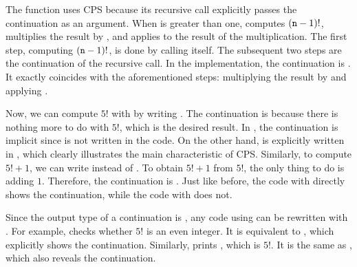 The function uses CPS because its recursive call explicitly passes the
continuation as an argument. When  is greater than one,
 computes $(\texttt{n}-1)!$, multiplies the result by
, and applies  to the result of the multiplication. The first
step, computing $(\texttt{n}-1)!$, is done by calling  itself.
The subsequent two steps are the continuation of the recursive call. In the
implementation, the continuation is . It exactly coincides
with the aforementioned steps: multiplying the result by  and applying
.

Now, we can compute $5!$ with  by writing
.
The continuation is  because there is nothing more to do with
$5!$, which is the desired result. In , the continuation is
implicit since  is not written in the code. On the other hand,
 is explicitly written in , which
clearly illustrates the main characteristic of CPS.
Similarly, to compute $5!+1$, we can write 
instead of . To obtain $5!+1$ from $5!$, the only thing
to do is adding $1$. Therefore, the continuation is . Just like
before, the code with  directly shows the continuation,
while the code with  does not.

Since the output type of a continuation is , any code using
 can be rewritten with . For example,
 checks whether $5!$ is an even integer. It is
equivalent to , which explicitly shows
the continuation. Similarly,  prints ,
which is $5!$. It is the same as , which also
reveals the continuation.


